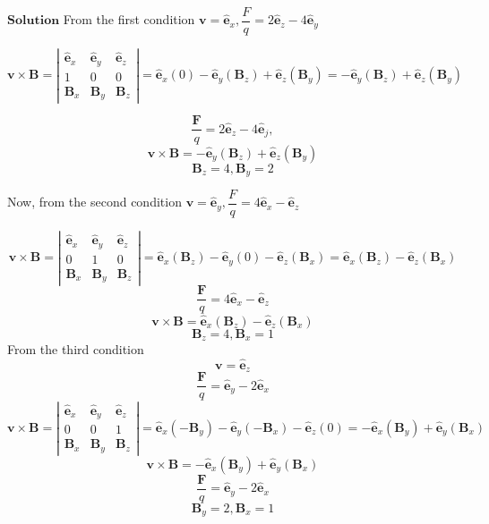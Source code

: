 $\boxed{\textbf{Solution}}$ From the first condition $\mathbf{v}=\hat{\mathbf{e}}_{x}, \dfrac{F}{q}=2 \hat{\mathbf{e}}_{z}-4 \hat{\mathbf{e}}_{\dot{y}}$

$$
\mathbf{v} \times \mathbf{B}=\left|\begin{array}{ccc}
\hat{\mathbf{e}}_{x} & \hat{\mathbf{e}}_{y} & \hat{\mathbf{e}}_{z} \\
1 & 0 & 0 \\
\mathbf{B}_{x} & \mathbf{B}_{y} & \mathbf{B}_{z}
\end{array}\right|=\hat{\mathbf{e}}_{x}(0)-\hat{\mathbf{e}}_{y}\left(\mathbf{B}_{z}\right)+\hat{\mathbf{e}}_{z}\left(\mathbf{B}_{y}\right)=-\hat{\mathbf{e}}_{y}\left(\mathbf{B}_{z}\right)+\hat{\mathbf{e}}_{z}\left(\mathbf{B}_{y}\right)
$$

$$\frac{\mathbf{F}}{q}=2 \hat{\mathbf{e}}_{z}-4 \hat{\mathbf{e}}_{j},$$
$$ \mathbf{v} \times \mathbf{B}=-\hat{\mathbf{e}}_{y}\left(\mathbf{B}_{z}\right)+\hat{\mathbf{e}}_{z}\left(\mathbf{B}_{y}\right)$$
$$\mathbf{B}_{z}=4, \mathbf{B}_{y}=2$$

Now, from the second condition $\mathbf{v}=\hat{\mathbf{e}}_{y}, \dfrac{F}{q}=4 \hat{\mathbf{e}}_{x}-\hat{\mathbf{e}}_{z}$

$$
\mathbf{v} \times \mathbf{B}=\left|\begin{array}{ccc}
\hat{\mathbf{e}}_{x} & \hat{\mathbf{e}}_{y} & \hat{\mathbf{e}}_{z} \\
0 & 1 & 0 \\
\mathbf{B}_{x} & \mathbf{B}_{y} & \mathbf{B}_{z}
\end{array}\right|=\hat{\mathbf{e}}_{x}\left(\mathbf{B}_{z}\right)-\hat{\mathbf{e}}_{y}(0)-\hat{\mathbf{e}}_{z}\left(\mathbf{B}_{x}\right)=\hat{\mathbf{e}}_{x}\left(\mathbf{B}_{z}\right)-\hat{\mathbf{e}}_{z}\left(\mathbf{B}_{x}\right)
$$
$$\frac{\mathbf{F}}{q}=4 \hat{\mathbf{e}}_{x}-\hat{\mathbf{e}}_{z}$$
$$ \mathbf{v} \times \mathbf{B}=\hat{\mathbf{e}}_{x}\left(\mathbf{B}_{z}\right)-\hat{\mathbf{e}}_{z}\left(\mathbf{B}_{x}\right)$$
$$\mathbf{B}_{z}=4, \mathbf{B}_{x}=1$$
From the third condition 
$$
\mathbf{v}=\hat{\mathbf{e}}_{z}$$
$$ \frac{\mathbf{F}}{q}=\hat{\mathbf{e}}_{y}-2 \hat{\mathbf{e}}_{x}
$$
$$
\mathbf{v} \times \mathbf{B}=\left|\begin{array}{ccc}
\hat{\mathbf{e}}_{x} & \hat{\mathbf{e}}_{y} & \hat{\mathbf{e}}_{z} \\
0 & 0 & 1 \\
\mathbf{B}_{x} & \mathbf{B}_{y} & \mathbf{B}_{z}
\end{array}\right|=\hat{\mathbf{e}}_{x}\left(-\mathbf{B}_{y}\right)-\hat{\mathbf{e}}_{y}\left(-\mathbf{B}_{x}\right)-\hat{\mathbf{e}}_{z}(0)=-\hat{\mathbf{e}}_{x}\left(\mathbf{B}_{y}\right)+\hat{\mathbf{e}}_{y}\left(\mathbf{B}_{x}\right)
$$
$$\mathbf{v} \times \mathbf{B}=-\hat{\mathbf{e}}_{x}\left(\mathbf{B}_{y}\right)+\hat{\mathbf{e}}_{y}\left(\mathbf{B}_{x}\right)$$
$$ \frac{\mathbf{F}}{q}=\hat{\mathbf{e}}_{y}-2 \hat{\mathbf{e}}_{x}$$
$$\mathbf{B}_{y}=2, \mathbf{B}_{x}=1$$

